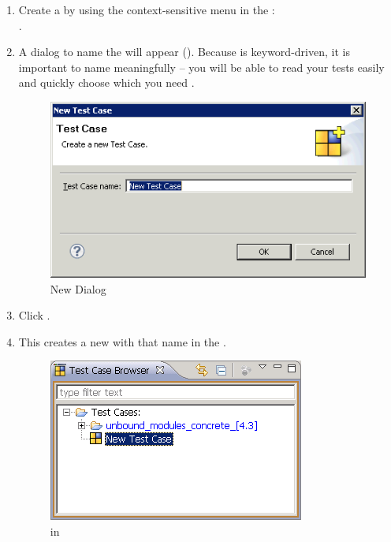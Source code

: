 \begin{enumerate}
\item Create a \gdcase{} by using the context-sensitive menu in the \gdtestcasebrowser{}:\\
.

\item A dialog to name the \gdcase{} will appear (). Because \jb{} is keyword-driven, it is important to name \gdcases{} meaningfully --  you will be able to read your tests easily and quickly choose which \gdcase{} you need  . 

\begin{figure}[h]
\begin{center}
\includegraphics[width=12.5cm]{Tasks/Testcases/PS/newtestcasedialog}
\caption{New \gdcase{} Dialog}
\label{newtestcasedialog}
\end{center}
\end{figure} 

\item Click . 
\item This creates a new \gdcase{} with that name in the \gdtestcasebrowser{} .

\begin{figure}[h]
\begin{center}
\includegraphics{Tasks/Testcases/PS/newtestcaseinbrowser}
\caption{\gdcase{} in \gdtestcasebrowser{}}
\label{newtestcaseinbrowser}
\end{center}
\end{figure} 

\end{enumerate}

